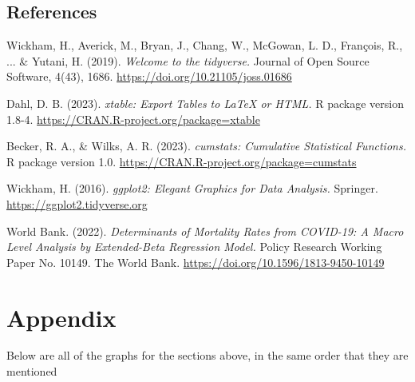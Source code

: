 \documentclass{article}\usepackage[]{graphicx}\usepackage[]{xcolor}
\begin{document}
\begin{multicols}{2}
\vspace{2em}
\begin{tiny}

\section{References}

Wickham, H., Averick, M., Bryan, J., Chang, W., McGowan, L. D., François, R., ... \& Yutani, H. (2019).  
\textit{Welcome to the tidyverse.} Journal of Open Source Software, 4(43), 1686.  
\url{https://doi.org/10.21105/joss.01686}  

Dahl, D. B. (2023). \textit{xtable: Export Tables to LaTeX or HTML.} R package version 1.8-4.  
\url{https://CRAN.R-project.org/package=xtable}  

Becker, R. A., \& Wilks, A. R. (2023). \textit{cumstats: Cumulative Statistical Functions.}  
R package version 1.0. \url{https://CRAN.R-project.org/package=cumstats}  

Wickham, H. (2016). \textit{ggplot2: Elegant Graphics for Data Analysis.} Springer.  
\url{https://ggplot2.tidyverse.org}  

World Bank. (2022). \textit{Determinants of Mortality Rates from COVID-19: A Macro Level Analysis by Extended-Beta Regression Model.}  
Policy Research Working Paper No. 10149. The World Bank.  
\url{https://doi.org/10.1596/1813-9450-10149}  


\end{tiny}
\end{multicols}

\newpage
\onecolumn
\section{Appendix}
Below are all of the graphs for the sections above, in the same order that they are mentioned
\end{document}
